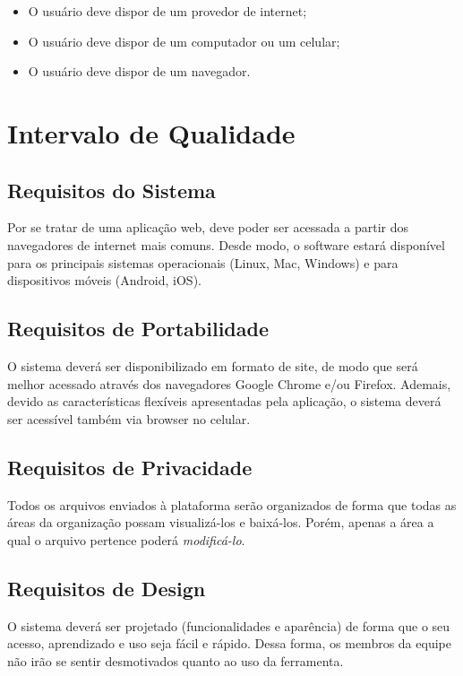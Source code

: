 \begin{apendicesenv}
\begin{itemize}
  \item O usuário deve dispor de um provedor de internet;
  \item O usuário deve dispor de um computador ou um celular;
  \item O usuário deve dispor de um navegador.
\end{itemize}

\section{Intervalo de Qualidade}
\subsection{Requisitos do Sistema}
Por se tratar de uma aplicação web, deve poder ser acessada a partir dos navegadores de internet mais comuns. Desde modo, o software estará disponível para os principais sistemas operacionais (Linux, Mac, Windows) e para dispositivos móveis (Android, iOS).

\subsection{Requisitos de Portabilidade}
O sistema deverá ser disponibilizado em formato de site, de modo que será melhor acessado através dos navegadores Google Chrome e/ou Firefox. Ademais, devido as características flexíveis apresentadas pela aplicação, o sistema deverá ser acessível também via browser no celular.

\subsection{Requisitos de Privacidade}
Todos os arquivos enviados à plataforma serão organizados de forma que todas as áreas da organização possam visualizá-los e baixá-los. Porém, apenas a área a qual o arquivo pertence poderá \textit{modificá-lo}.

\subsection{Requisitos de Design}
O sistema deverá ser projetado (funcionalidades e aparência) de forma que o seu acesso, aprendizado e uso seja fácil e rápido. Dessa forma, os membros da equipe não irão se sentir desmotivados quanto ao uso da ferramenta.








\end{apendicesenv}
